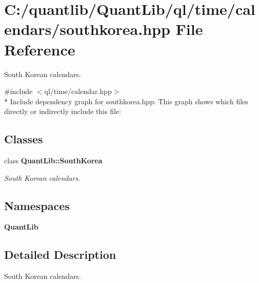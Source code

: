 \section{C\+:/quantlib/\+Quant\+Lib/ql/time/calendars/southkorea.hpp File Reference}
\label{southkorea_8hpp}


South Korean calendars.  


{\ttfamily \#include $<$ql/time/calendar.\+hpp$>$}\\*
Include dependency graph for southkorea.\+hpp\+:
This graph shows which files directly or indirectly include this file\+:
\subsection*{Classes}
\begin{DoxyCompactItemize}
\item 
class {\bf Quant\+Lib\+::\+South\+Korea}
\begin{DoxyCompactList}\small\item\em South Korean calendars. \end{DoxyCompactList}\end{DoxyCompactItemize}
\subsection*{Namespaces}
\begin{DoxyCompactItemize}
\item 
 {\bf Quant\+Lib}
\end{DoxyCompactItemize}


\subsection{Detailed Description}
South Korean calendars. 

